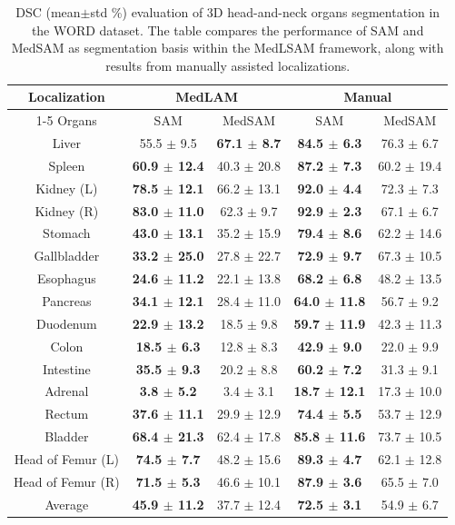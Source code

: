 \begin{table}[!h]
\caption{DSC (mean$\pm$std \%) evaluation of 3D head-and-neck organs segmentation in the WORD dataset. The table compares the performance of SAM and MedSAM as segmentation basis within the MedLSAM framework, along with results from manually assisted localizations.}
\centering
\begin{tabular}{c|cc|cc} \hline
Localization & \multicolumn{2}{c|}{MedLAM} & \multicolumn{2}{c}{Manual} \\ \cline{1-5}
Organs & SAM & MedSAM & SAM & MedSAM\\\hline
Liver & 55.5 $\pm$ 9.5 & \textbf{67.1 $\pm$ 8.7} & \textbf{84.5 $\pm$ 6.3} & 76.3 $\pm$ 6.7 \\
Spleen & \textbf{60.9 $\pm$ 12.4} & 40.3 $\pm$ 20.8 & \textbf{87.2 $\pm$ 7.3} & 60.2 $\pm$ 19.4 \\
Kidney (L) & \textbf{78.5 $\pm$ 12.1} & 66.2 $\pm$ 13.1 & \textbf{92.0 $\pm$ 4.4} & 72.3 $\pm$ 7.3 \\
Kidney (R) & \textbf{83.0 $\pm$ 11.0} & 62.3 $\pm$ 9.7 & \textbf{92.9 $\pm$ 2.3} & 67.1 $\pm$ 6.7 \\
Stomach & \textbf{43.0 $\pm$ 13.1} & 35.2 $\pm$ 15.9 & \textbf{79.4 $\pm$ 8.6} & 62.2 $\pm$ 14.6 \\
Gallbladder & \textbf{33.2 $\pm$ 25.0} & 27.8 $\pm$ 22.7 & \textbf{72.9 $\pm$ 9.7} & 67.3 $\pm$ 10.5 \\
Esophagus & \textbf{24.6 $\pm$ 11.2} & 22.1 $\pm$ 13.8 & \textbf{68.2 $\pm$ 6.8} & 48.2 $\pm$ 13.5 \\
Pancreas & \textbf{34.1 $\pm$ 12.1} & 28.4 $\pm$ 11.0 & \textbf{64.0 $\pm$ 11.8} & 56.7 $\pm$ 9.2 \\
Duodenum & \textbf{22.9 $\pm$ 13.2} & 18.5 $\pm$ 9.8 & \textbf{59.7 $\pm$ 11.9} & 42.3 $\pm$ 11.3 \\
Colon & \textbf{18.5 $\pm$ 6.3} & 12.8 $\pm$ 8.3 & \textbf{42.9 $\pm$ 9.0} & 22.0 $\pm$ 9.9 \\
Intestine & \textbf{35.5 $\pm$ 9.3} & 20.2 $\pm$ 8.8 & \textbf{60.2 $\pm$ 7.2} & 31.3 $\pm$ 9.1 \\
Adrenal & \textbf{3.8 $\pm$ 5.2} & 3.4 $\pm$ 3.1 & \textbf{18.7 $\pm$ 12.1} & 17.3 $\pm$ 10.0 \\
Rectum & \textbf{37.6 $\pm$ 11.1} & 29.9 $\pm$ 12.9 & \textbf{74.4 $\pm$ 5.5} & 53.7 $\pm$ 12.9 \\
Bladder & \textbf{68.4 $\pm$ 21.3} & 62.4 $\pm$ 17.8 & \textbf{85.8 $\pm$ 11.6} & 73.7 $\pm$ 10.5 \\
Head of Femur (L) & \textbf{74.5 $\pm$ 7.7} & 48.2 $\pm$ 15.6 & \textbf{89.3 $\pm$ 4.7} & 62.1 $\pm$ 12.8 \\
Head of Femur (R) & \textbf{71.5 $\pm$ 5.3} & 46.6 $\pm$ 10.1 & \textbf{87.9 $\pm$ 3.6} & 65.5 $\pm$ 7.0 \\
\hline
Average & \textbf{45.9 $\pm$ 11.2} & 37.7 $\pm$ 12.4 & \textbf{72.5 $\pm$ 3.1} & 54.9 $\pm$ 6.7\\
\hline
\end{tabular}
\label{tab:word}
\end{table}
